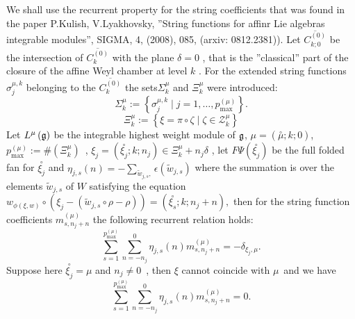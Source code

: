 \documentclass{article}
\begin{document}
We shall use the recurrent property for the string coefficients that was
found in the paper P.Kulish, V.Lyakhovsky, ''String functions for affinr Lie
algebras integrable modules'', SIGMA, 4, (2008), 085, (arxiv: 0812.2381)).
Let $\overline{C_{k;0}^{\left( 0\right) }}$ be the intersection of $%
\overline{C_{k}^{\left( 0\right) }}$ with the plane $\delta =0$ , that is
the ''classical'' part of the closure of the affine Weyl chamber at level $k$
. For the extended string functions $\sigma _{j}^{\mu ,k}$ belonging to the $%
\overline{C_{k}^{\left( 0\right) }}$ the sets$\Sigma _{k}^{\mu }$ and $\Xi
_{k}^{\mu }$ were introduced: 
\begin{equation}
\Sigma _{k}^{\mu }:=\left\{ \sigma _{j}^{\mu ,k}\mid j=1,\ldots ,p_{\max
}^{\left( \mu \right) }\right\} .  \label{strings-for-mu}
\end{equation}
\begin{equation}
\Xi _{k}^{\mu }:=\left\{ \xi =\pi \circ \zeta \mid \zeta \in \mathcal{Z}%
_{k}^{\mu }\right\}  \label{maxes-for-mu}
\end{equation}
Let $L^{\mu }\left( \frak{g}\right) $ be the integrable highest weight
module of $\frak{g}$, $\mu =\left( \overset{\circ }{\mu };k;0\right) $, $%
p_{\max }^{\left( \mu \right) }:=\#\left( \Xi _{k}^{\mu }\right) $\ , $\xi
_{j}=\left( \overset{\circ }{\xi _{j}};k;n_{j}\right) \in \Xi _{k}^{\mu
}+n_{j}\delta $ , let $F\Psi \left( \overset{\circ }{\xi _{j}}\right) $ be
the full folded fan for $\overset{\circ }{\xi _{j}}$ and $\eta _{j,s}\left(
n\right) =-\sum_{\tilde{w}_{j,s},}\epsilon (\tilde{w}_{j,s})$ where the
summation is over the elements $\tilde{w}_{j,s}$ of $W$ satisfying the
equation $w_{\phi \left( \xi ,w\right) }\circ \left( \xi _{j}-\left( \tilde{w%
}_{j,s}\circ \rho -\rho \right) \right) =\left( \overset{\circ }{\xi _{s}}%
;k;n_{j}+n\right) ,$ then for the string function coefficients $%
m_{s,n_{j}+n}^{\left( \mu \right) }$ the following recurrent relation holds: 
\begin{equation}
\sum_{s=1}^{p_{\max }^{\left( \mu \right) }}\sum_{n=-n_{j}}^{0}\eta
_{j,s}\left( n\right) m_{s,n_{j}+n}^{\left( \mu \right) }=-\delta _{\xi
_{j},\mu }.  \label{recursion-prop-string}
\end{equation}
Suppose here $\overset{\circ }{\xi _{j}}=\mu $ and $n_{j}\neq 0$\ , then $%
\xi $ cannot coincide with $\mu $\ and we have 
\begin{equation*}
\sum_{s=1}^{p_{\max }^{\left( \mu \right) }}\sum_{n=-n_{j}}^{0}\eta
_{j,s}\left( n\right) m_{s,n_{j}+n}^{\left( \mu \right) }=0.
\end{equation*}
\end{document}
